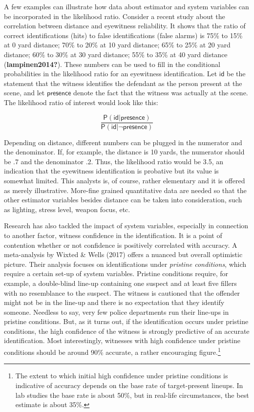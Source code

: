 \documentclass[
  letterpaper,
  DIV=11,
  numbers=noendperiod]{scrartcl}
\newcommand{\pr}[1]{\mathsf{P}(#1)}
\begin{document}
A few examples can illustrate how data about estimator and system
variables can be incorporated in the likelihood ratio. Consider a recent
study about the correlation between distance and eyewitness reliability.
It shows that the ratio of correct identifications (hits) to false
identifications (false alarms) is 75\% to 15\% at 0 yard distance; 70\%
to 20\% at 10 yard distance; 65\% to 25\% at 20 yard distance; 60\% to
30\% at 30 yard distance; 55\% to 35\% at 40 yard distance
(\textbf{lampinen2014?}). These numbers can be used to fill in the
conditional probabilities in the likelihood ratio for an eyewitness
identification. Let \(\textsf{id}\) be the statement that the witness
identifies the defendant as the person present at the scene, and let
\(\textsf{presence}\) denote the fact that the witness was actually at
the scene. The likelihood ratio of interest would look like this:

\[
\frac{\pr{\textsf{id} \vert \textsf{presence}}}{\pr{\textsf{id} \vert \neg \textsf{presence}}}
\]

\noindent Depending on distance, different numbers can be plugged in the
numerator and the denominator. If, for example, the distance is 10
yards, the numerator should be .7 and the denominator .2. Thus, the
likelihood ratio would be 3.5, an indication that the eyewitness
identification is probative but its value is somewhat limited. This
analysts is, of course, rather elementary and it is offered as merely
illustrative. More-fine grained quantitative data are needed so that the
other estimator variables besides distance can be taken into
consideration, such as lighting, stress level, weapon focus, etc.

Research has also tackled the impact of system variables, especially in
connection to another factor, witness confidence in the identification.
It is a point of contention whether or not confidence is positively
correlated with accuracy. A meta-analysis by Wixted \& Wells (2017)
offers a nuanced but overall optimistic picture. Their analysis focuses
on identifications under \emph{pristine conditions}, which require a
certain set-up of system variables. Pristine conditions require, for
example, a double-blind line-up containing one suspect and at least five
fillers with no resemblance to the suspect. The witness is cautioned
that the offender might not be in the line-up and there is no
expectation that they identify someone. Needless to say, very few police
departments run their line-ups in pristine conditions. But, as it turns
out, if the identification occurs under pristine conditions, the high
confidence of the witness is strongly predictive of an accurate
identification. Most interestingly, witnesses with high confidence under
pristine conditions should be around 90\% accurate, a rather encouraging
figure.\footnote{The extent to which initial high confidence under
  pristine conditions is indicative of accuracy depends on the base rate
  of target-present lineups. In lab studies the base rate is about 50\%,
  but in real-life circumstances, the best estimate is about 35\%.}
\end{document}
